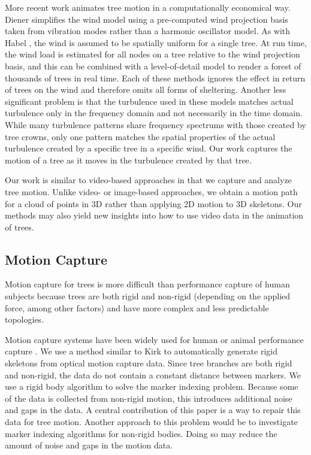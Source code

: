 More recent work \cite{diener:cgf09,Habel09PGT} animates tree motion in a computationally economical way. Diener \cite{diener:cgf09} simplifies the wind model using a pre-computed wind projection basis taken from vibration modes rather than a harmonic oscillator model. As with Habel \cite{Habel09PGT}, the wind is assumed to be spatially uniform for a single tree. At run time, the wind load is estimated for all nodes on a tree relative to the wind projection basis, and this can be combined with a level-of-detail model to render a forest of thousands of trees in real time. Each of these methods ignores the effect in return of trees on the wind and therefore omits all forms of sheltering. Another less significant problem is that the turbulence used in these models matches actual turbulence only in the frequency domain and not necessarily in the time domain. While many turbulence patterns share frequency spectrums with those created by tree crowns, only one pattern matches the spatial properties of the actual turbulence created by a specific tree in a specific wind. Our work captures the motion of a tree as it moves in the turbulence created by that tree.

Our work is similar to video-based approaches in that we capture and analyze tree motion. Unlike video- \cite{Diener:2006} or image-based \cite{wu:cas99} approaches, we obtain a motion path for a cloud of points in 3D rather than applying 2D motion to 3D skeletons. Our methods may also yield new insights into how to use video data in the animation of trees.

\subsection{Motion Capture}

Motion capture for trees is more difficult than performance capture of human subjects because trees are both rigid and non-rigid (depending on the applied force, among other factors) and have more complex and less predictable topologies.  

Motion capture systems have been widely used for human or animal performance capture \cite{Rosenhahn:KI06,ZordanVictorBrian2003}. We use a method similar to Kirk \cite{Kirk:2005:SPE} to automatically generate rigid skeletons from optical motion capture data. Since tree branches are both rigid and non-rigid, the data do not contain a constant distance between markers.  We use a rigid body algorithm to solve the marker indexing problem. Because some of the data is collected from non-rigid motion, this introduces additional noise and gaps in the data.  A central contribution of this paper is a way to repair this data for tree motion.  Another approach to this problem would be to investigate marker indexing algorithms for non-rigid bodies.  Doing so may reduce the amount of noise and gaps in the motion data.  

